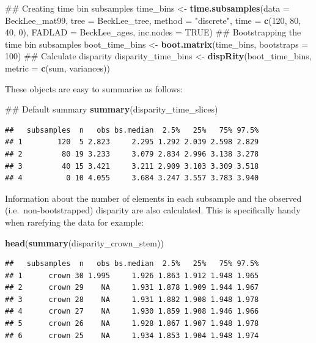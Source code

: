 \documentclass[]{book}
\newenvironment{Shaded}{\begin{snugshade}}{\end{snugshade}}
\newcommand{\KeywordTok}[1]{\textcolor[rgb]{0.13,0.29,0.53}{\textbf{#1}}}
\newcommand{\DataTypeTok}[1]{\textcolor[rgb]{0.13,0.29,0.53}{#1}}
\newcommand{\DecValTok}[1]{\textcolor[rgb]{0.00,0.00,0.81}{#1}}
\newcommand{\StringTok}[1]{\textcolor[rgb]{0.31,0.60,0.02}{#1}}
\newcommand{\OtherTok}[1]{\textcolor[rgb]{0.56,0.35,0.01}{#1}}
\newcommand{\NormalTok}[1]{#1}
\theoremstyle{definition}
\theoremstyle{definition}
\theoremstyle{remark}
\begin{document}
\begin{Shaded}
\begin{Highlighting}[]
\NormalTok{## Creating time bin subsamples}
\NormalTok{time_bins <-}\StringTok{ }\KeywordTok{time.subsamples}\NormalTok{(}\DataTypeTok{data =}\NormalTok{ BeckLee_mat99, }\DataTypeTok{tree =}\NormalTok{ BeckLee_tree, }
    \DataTypeTok{method =} \StringTok{"discrete"}\NormalTok{, }\DataTypeTok{time =} \KeywordTok{c}\NormalTok{(}\DecValTok{120}\NormalTok{, }\DecValTok{80}\NormalTok{, }\DecValTok{40}\NormalTok{, }\DecValTok{0}\NormalTok{), }\DataTypeTok{FADLAD =}\NormalTok{ BeckLee_ages,}
    \DataTypeTok{inc.nodes =} \OtherTok{TRUE}\NormalTok{)}
\NormalTok{## Bootstrapping the time bin subsamples}
\NormalTok{boot_time_bins <-}\StringTok{ }\KeywordTok{boot.matrix}\NormalTok{(time_bins, }\DataTypeTok{bootstraps =} \DecValTok{100}\NormalTok{)}
\NormalTok{## Calculate disparity}
\NormalTok{disparity_time_bins <-}\StringTok{ }\KeywordTok{dispRity}\NormalTok{(boot_time_bins, }\DataTypeTok{metric =} \KeywordTok{c}\NormalTok{(sum, variances))}
\end{Highlighting}
\end{Shaded}

These objects are easy to summarise as follows:

\begin{Shaded}
\begin{Highlighting}[]
\NormalTok{## Default summary}
\KeywordTok{summary}\NormalTok{(disparity_time_slices)}
\end{Highlighting}
\end{Shaded}

\begin{verbatim}
##   subsamples  n   obs bs.median  2.5%   25%   75% 97.5%
## 1        120  5 2.823     2.295 1.292 2.039 2.598 2.829
## 2         80 19 3.233     3.079 2.834 2.996 3.138 3.278
## 3         40 15 3.421     3.211 2.909 3.103 3.309 3.518
## 4          0 10 4.055     3.684 3.247 3.557 3.783 3.940
\end{verbatim}

Information about the number of elements in each subsample and the
observed (i.e.~non-bootstrapped) disparity are also calculated. This is
specifically handy when rarefying the data for example:

\begin{Shaded}
\begin{Highlighting}[]
\KeywordTok{head}\NormalTok{(}\KeywordTok{summary}\NormalTok{(disparity_crown_stem))}
\end{Highlighting}
\end{Shaded}

\begin{verbatim}
##   subsamples  n   obs bs.median  2.5%   25%   75% 97.5%
## 1      crown 30 1.995     1.926 1.863 1.912 1.948 1.965
## 2      crown 29    NA     1.931 1.878 1.909 1.944 1.967
## 3      crown 28    NA     1.931 1.882 1.908 1.948 1.978
## 4      crown 27    NA     1.930 1.859 1.908 1.946 1.966
## 5      crown 26    NA     1.928 1.867 1.907 1.948 1.978
## 6      crown 25    NA     1.934 1.853 1.904 1.948 1.974
\end{verbatim}
\end{document}
